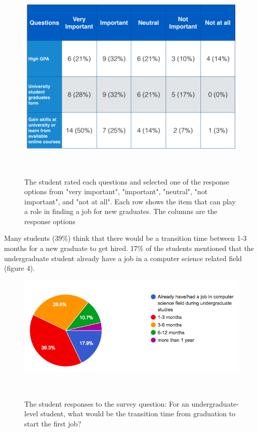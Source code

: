 \documentclass{sigchi}
\begin{document}
\begin{figure}
\centering
  \includegraphics[width=1.05\columnwidth]{figures/important_notimportant_table_s}
  \caption{The student rated each questions and selected one of the response options from "very important", "important", "neutral", "not important", and "not at all". Each row shows the item that can play a role in finding a job for new graduates. The columns are the response options}~\label{fig:figure3}
\end{figure}

Many students (39\%) think that there would be a transition time between 1-3 months for a new graduate to get hired. 17\% of the students mentioned that the undergraduate student already have a job in a computer science related field (figure 4).

\begin{figure}
\centering
  \includegraphics[width=1.05\columnwidth]{figures/transition_time_s}
  \caption{The student responses to the survey question: For an undergraduate-level student, what would be the transition time from graduation to start the first job? }~\label{fig:figure4}
\end{figure}
\end{document}
